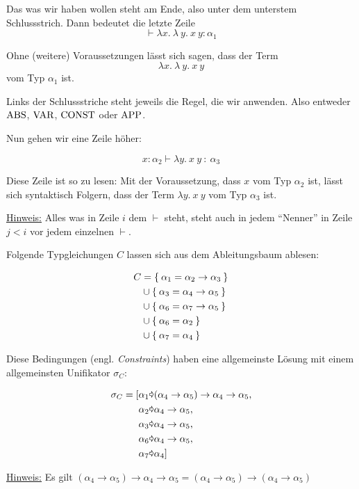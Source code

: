 Das was wir haben wollen steht am Ende, also unter dem unterstem Schlussstrich.
Dann bedeutet die letzte Zeile 
\[\vdash \lambda x.\ \lambda \ y.\ x\ y: \alpha_1\]

Ohne (weitere) Voraussetzungen lässt sich sagen, dass der Term
\[\lambda x.\ \lambda \ y.\ x\ y\]
vom Typ $\alpha_1$ ist.

Links der Schlussstriche steht jeweils die Regel, die wir anwenden. Also entweder
$\operatorname{ABS}$, $\operatorname{VAR}$, $\operatorname{CONST}$ oder $\operatorname{APP}$.

Nun gehen wir eine Zeile höher:

\[x:\alpha_2 \vdash \lambda y.\ x\ y\ :\ \alpha_3\]

Diese Zeile ist so zu lesen: Mit der Voraussetzung, dass $x$ vom Typ $\alpha_2$
ist, lässt sich syntaktisch Folgern, dass der Term $\lambda y.\ x\ y$ vom
Typ $\alpha_3$ ist.

\underline{Hinweis:} Alles was in Zeile $i$ dem $\vdash$ steht, steht auch in 
jedem \enquote{Nenner} in Zeile $j < i$ vor jedem einzelnen $\vdash$.

Folgende Typgleichungen $C$ lassen sich aus dem Ableitungsbaum ablesen:

\begin{align*}
	C &= \Set{\alpha_1 = \alpha_2 \rightarrow \alpha_3}\\
	  &\cup \Set{\alpha_3 = \alpha_4 \rightarrow \alpha_5}\\
	  &\cup \Set{\alpha_6 = \alpha_7 \rightarrow \alpha_5}\\
	  &\cup \Set{\alpha_6 = \alpha_2}\\
	  &\cup \Set{\alpha_7 = \alpha_4}
\end{align*}

Diese Bedingungen (engl. \textit{Constraints}) haben eine
allgemeinste Lösung mit einem allgemeinsten Unifikator $\sigma_C$:

\begin{align*}
	\sigma_C = [&\alpha_1 \Parr (\alpha_4 \rightarrow \alpha_5) \rightarrow \alpha_4 \rightarrow \alpha_5,\\
	&\alpha_2 \Parr \alpha_4 \rightarrow \alpha_5,\\
	&\alpha_3 \Parr \alpha_4 \rightarrow \alpha_5,\\
	&\alpha_6 \Parr \alpha_4 \rightarrow \alpha_5,\\
	&\alpha_7 \Parr \alpha_4]
\end{align*}

\underline{Hinweis:} Es gilt $(\alpha_4 \rightarrow \alpha_5) \rightarrow \alpha_4 \rightarrow \alpha_5 = (\alpha_4 \rightarrow \alpha_5) \rightarrow (\alpha_4 \rightarrow \alpha_5)$

